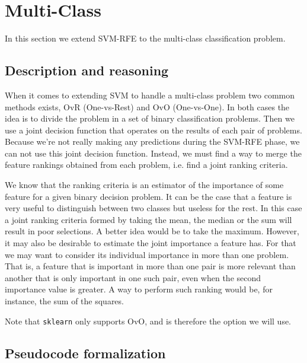 

\section{Multi-Class}

In this section we extend SVM-RFE to the multi-class classification problem.

\subsection{Description and reasoning}
\label{sec:stopCond.desc}

When it comes to extending SVM to handle a multi-class problem two common methods exists, OvR (One-vs-Rest) and OvO (One-vs-One). In both cases the idea is to divide the problem in a set of binary classification problems. Then we use a joint decision function that operates on the results of each pair of problems. Because we're not really making any predictions during the SVM-RFE phase, we can not use this joint decision function. Instead, we must find a way to merge the feature rankings obtained from each problem, i.e. find a joint ranking criteria.

We know that the ranking criteria is an estimator of the importance of some feature for a given binary decision problem. It can be the case that a feature is very useful to distinguish between two classes but useless for the rest. In this case a joint ranking criteria formed by taking the mean, the median or the sum will result in poor selections. A better idea would be to take the maximum. However, it may also be desirable to estimate the joint importance a feature has. For that we may want to consider its individual importance in more than one problem. That is, a feature that is important in more than one pair is more relevant than another that is only important in one such pair, even when the second importance value is greater. A way to perform such ranking would be, for instance, the sum of the squares.

Note that \texttt{sklearn} only supports OvO, and is therefore the option we will use.

\subsection{Pseudocode formalization}

